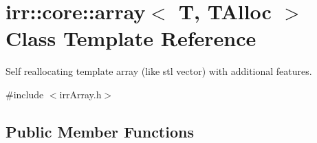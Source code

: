 \hypertarget{classirr_1_1core_1_1array}{}\section{irr\+:\+:core\+:\+:array$<$ T, T\+Alloc $>$ Class Template Reference}
\label{classirr_1_1core_1_1array}


Self reallocating template array (like stl vector) with additional features.  




{\ttfamily \#include $<$irr\+Array.\+h$>$}

\subsection*{Public Member Functions}
